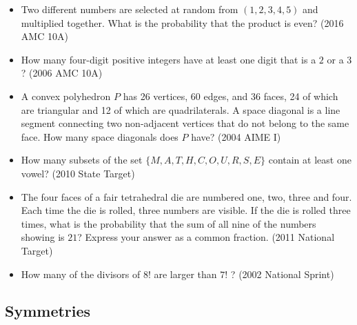 \documentclass{article}
\begin{document}
\begin{itemize}
\item Two different numbers are selected at random from $(1,2,3,4,5)$ and multiplied together. What is the probability that the product is even? (2016 AMC 10A)

\item How many four-digit positive integers have at least one digit that is a $2$ or a $3$? (2006 AMC 10A)

\item A convex polyhedron $P$ has 26 vertices, 60 edges, and 36 faces, 24 of which are triangular and 12 of which are quadrilaterals. A space diagonal is a line segment connecting two non-adjacent vertices that do not belong to the same face. How many space diagonals does $P$ have? (2004 AIME I)

\item How many subsets of the set $\{ M, A, T, H, C, O, U, R, S, E\}$ contain at least one vowel? (2010 State Target)

\item The four faces of a fair tetrahedral die are numbered one, two, three and four. Each time the die is rolled, three numbers are visible. If the die is rolled three times, what is the probability that the sum of all nine of the numbers showing is $21$? Express your answer as a common fraction. (2011 National Target)

\item How many of the divisors of $8!$ are larger than $7!$ ? (2002 National Sprint)

\end{itemize}


\subsection{Symmetries}
\end{document}
